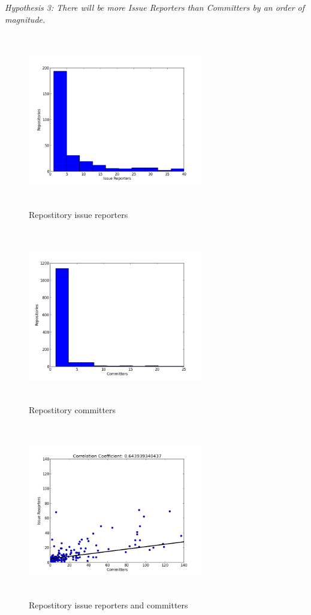 \documentclass{proc}
\begin{document}
\emph{Hypothesis 3: There will be more Issue Reporters than Committers by an order of magnitude.}\\
\begin{figure}
\includegraphics[height=3in,width=3in]{images/issue_reporters_histogram.png}
\caption{Repostitory issue reporters}
\end{figure}
\begin{figure}
\includegraphics[height=3in,width=3in]{images/committers_histogram.png}
\caption{Repostitory committers}
\end{figure}
\begin{figure}
\includegraphics[height=3in,width=3in]{images/issue_reporters_committers_scatterplot.png}
\caption{Repostitory issue reporters and committers}
\end{figure}
\end{document}
